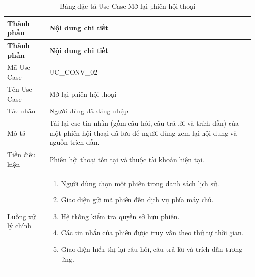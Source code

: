 \documentclass[12pt,a4paper,oneside]{report}
\begin{document}
{
  \begin{longtable}{|L{3.6cm}|L{11.2cm}|}
    \caption{Bảng đặc tả Use Case Mở lại phiên hội thoại}\label{tab:uc-conv-open}                                                                                      \\
    \hline
    \textbf{Thành phần} & \textbf{Nội dung chi tiết}                                                                                                                     \\
    \hline
    \endfirsthead
    \hline
    \textbf{Thành phần} & \textbf{Nội dung chi tiết}                                                                                                                     \\
    \hline
    \endhead
    Mã Use Case       & UC\_CONV\_02                                                                                                                                   \\
    \hline
    Tên Use Case      & Mở lại phiên hội thoại                                                                                                                         \\
    \hline
    Tác nhân            & Người dùng đã đăng nhập                                                                                                                        \\
    \hline
    Mô tả               & Tải lại các tin nhắn (gồm câu hỏi, câu trả lời và trích dẫn) của một phiên hội thoại đã lưu để người dùng xem lại nội dung và nguồn trích dẫn. \\
    \hline
    Tiền điều kiện      & Phiên hội thoại tồn tại và thuộc tài khoản hiện tại.                                                                                           \\
    \hline
    Luồng xử lý chính   & \begin{enumerate}[leftmargin=*,nosep]
                            \item Người dùng chọn một phiên trong danh sách lịch sử.
                            \item Giao diện gửi mã phiên đến dịch vụ phía máy chủ.
                            \item Hệ thống kiểm tra quyền sở hữu phiên.
                            \item Các tin nhắn của phiên được truy vấn theo thứ tự thời gian.
                            \item Giao diện hiển thị lại câu hỏi, câu trả lời và trích dẫn tương ứng.

\end{enumerate}
\end{longtable}}
\end{document}
